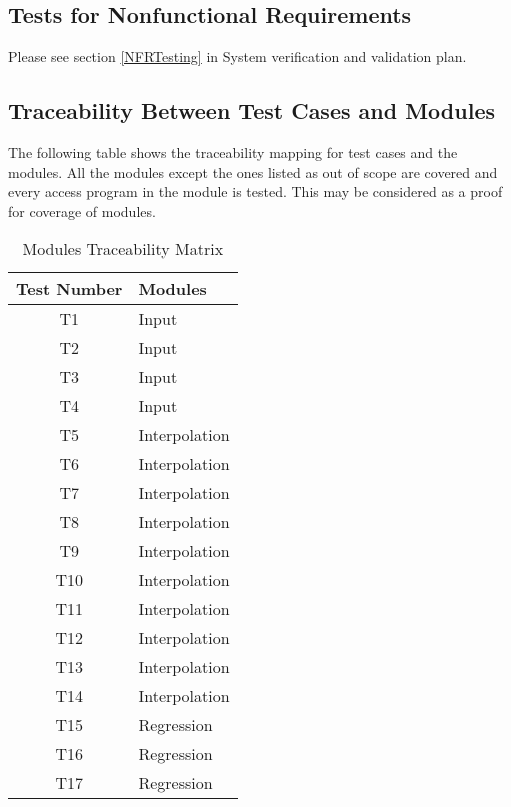 \documentclass[12pt, titlepage]{article}
\begin{document}
\begin{enumerate}
\subsection{Tests for Nonfunctional Requirements}

Please see section \ref{NFRTesting} in System verification and validation plan.

\subsection{Traceability Between Test Cases and Modules}


The following table shows the traceability mapping for test cases and the 
modules. All the modules except the ones listed as out of scope are covered and 
every access program in the module is tested. This may be considered as a proof 
for coverage of modules.

\begin{table} [H]
	\caption{Modules Traceability Matrix}
	\label{Table:Table_Traceability}  
	\begin{tabular}{|c|p{5cm}|}
		\hline	
		\textbf{Test Number} & \textbf{Modules} \\
		\hline 
		T1&  Input      \\ \hline
		T2&  Input      \\ \hline
		T3&  Input     \\ \hline
		T4&  Input     \\ \hline
		T5&  Interpolation      \\ \hline
		T6&  Interpolation     \\ \hline
		T7&  Interpolation     \\ \hline
		T8&  Interpolation      \\ \hline
		T9&  Interpolation     \\ \hline
		T10& Interpolation      \\ \hline
		T11& Interpolation      \\ \hline
		T12& Interpolation     \\ \hline
		T13& Interpolation     \\ \hline
		T14& Interpolation      \\ \hline
		T15& Regression     \\ \hline
		T16& Regression     \\ \hline
		T17& Regression      \\ \hline
		
	\end{tabular}\\
\end{table}


\end{enumerate}
\end{document}

